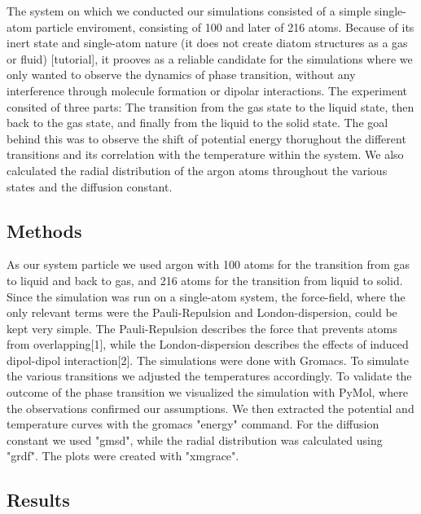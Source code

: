 \documentclass[10pt, a4paper, oneside, twocolumn]{article}
\begin{document}
The system on which we conducted our simulations consisted of a simple single-atom particle enviroment, consisting of 100 and later of 216 atoms. Because of its inert state and single-atom nature (it does not create diatom structures as a gas or fluid) [tutorial], it prooves as a reliable candidate for the simulations where we only wanted to observe the dynamics of phase
transition, without any interference through molecule formation or dipolar interactions. The experiment consited of three parts:
The transition from the gas state to the liquid state, then back to the gas state, and finally from the liquid to the solid state.
The goal behind this was to observe the shift of potential energy thorughout the different transitions and its correlation
with the temperature within the system. We also calculated the radial distribution of the argon atoms throughout the various states and the diffusion constant.

\subsection{Methods}

As our system particle we used argon with 100 atoms for the transition from gas to liquid and back to gas, and 216 atoms for the transition from liquid to solid. Since the simulation was run on a single-atom system, the force-field, where the only relevant terms were the Pauli-Repulsion and London-dispersion, could be kept very simple. The Pauli-Repulsion describes the force that prevents atoms from overlapping[1], while the London-dispersion describes the effects of induced dipol-dipol interaction[2]. The simulations were done with Gromacs. To simulate the various transitions we adjusted the temperatures accordingly. To validate
the outcome of the phase transition we visualized the simulation with PyMol, where the observations confirmed our assumptions.
We then extracted the potential and temperature curves with the gromacs "energy" command. For the diffusion constant we used "gmsd", while the radial distribution was calculated using "grdf". The plots were created with "xmgrace".


\subsection{Results}
\end{document}
